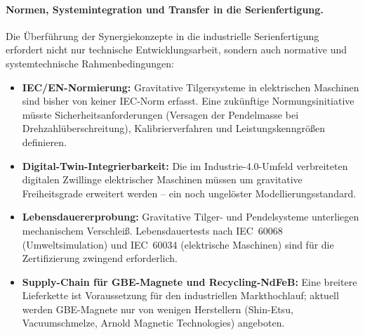 ﻿\documentclass[12pt, a4paper]{report}
\theoremstyle{definition}
\theoremstyle{remark}
\begin{document}
\paragraph{Normen, Systemintegration und Transfer in die Serienfertigung.}
Die Überführung der Synergiekonzepte in die industrielle Serienfertigung erfordert
nicht nur technische Entwicklungsarbeit, sondern auch normative und systemtechnische
Rahmenbedingungen:
\begin{itemize}
  \item \textbf{IEC/EN-Normierung:} Gravitative Tilgersysteme in elektrischen
        Maschinen sind bisher von keiner IEC-Norm erfasst. Eine zukünftige
        Normungsinitiative müsste Sicherheitsanforderungen (Versagen der
        Pendelmasse bei Drehzahlüberschreitung), Kalibrierverfahren und
        Leistungskenngrößen definieren.
  \item \textbf{Digital-Twin-Integrierbarkeit:} Die im Industrie-4.0-Umfeld
        verbreiteten digitalen Zwillinge elektrischer Maschinen müssen um
        gravitative Freiheitsgrade erweitert werden -- ein noch ungelöster
        Modellierungsstandard.
  \item \textbf{Lebensdauererprobung:} Gravitative Tilger- und Pendelsysteme
        unterliegen mechanischem Verschleiß. Lebens\-dauertests nach
        IEC~60068 (Umweltsimulation) und IEC~60034 (elektrische Maschinen) sind
        für die Zertifizierung zwingend erforderlich.
  \item \textbf{Supply-Chain für GBE-Magnete und Recycling-NdFeB:}
        Eine breitere Lieferkette ist Voraussetzung für den industriellen
        Markthochlauf; aktuell werden GBE-Magnete nur von wenigen Herstellern
        (Shin-Etsu, Vacuumschmelze, Arnold Magnetic Technologies) angeboten.
\end{itemize}
\end{document}
